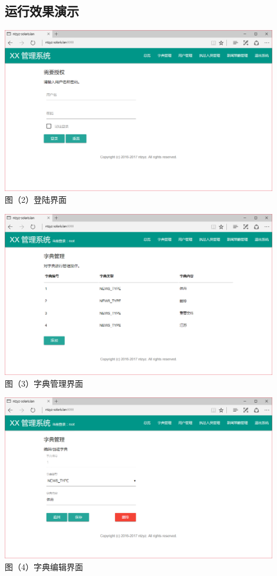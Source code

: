 \documentclass[a4paper, 12pt]{article}
\begin{document}
	\subsection{\normalfont 运行效果演示}
	\begin{center}
		\includegraphics[width=12cm]{login.png} \\
		\scriptsize 图（2）登陆界面
	\end{center}
	\begin{center}
		\includegraphics[width=12cm]{dictview.png} \\
		\scriptsize 图（3）字典管理界面
	\end{center}
	\begin{center}
		\includegraphics[width=12cm]{dictedit.png} \\
		\scriptsize 图（4）字典编辑界面
	\end{center}
\end{document}
